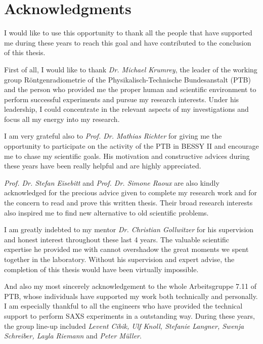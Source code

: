\pagestyle{empty}
\noindent
\section*{Acknowledgments}

I would like to use this opportunity to thank all the people that have supported me during these years to reach this goal and have contributed to the conclusion of this thesis.
\vspace{2ex}

\noindent First of all, I would like to thank \emph{Dr. Michael Krumrey}, the leader of the working group Röntgenradiometrie of the Physikalisch-Technische Bundesanstalt (PTB) and the person who provided me the proper human and scientific environment to perform successful experiments and pursue my research interests. Under his leadership, I could concentrate in the relevant aspects of my investigations and focus all my energy into my research.
\vspace{2ex}

\noindent I am very grateful also to \emph{Prof. Dr. Mathias Richter} for giving me the opportunity to participate on the activity of the PTB in BESSY II and encourage me to chase my scientific goals. His motivation and constructive advices during these years have been really helpful and are highly appreciated. 
\vspace{2ex}

\noindent \emph{Prof. Dr. Stefan Eisebitt} and \emph{Prof. Dr. Simone Raoux} are also kindly acknowledged for the precious advice given to complete my research work and for the concern to read and prove this written thesis. Their broad research interests also inspired me to find new alternative to old scientific problems.
\vspace{2ex}

\noindent I am greatly indebted to my mentor \emph{Dr. Christian Gollwitzer} for his supervision and honest interest throughout these last 4 years. The valuable scientific expertise he provided me with cannot overshadow the great moments we spent together in the laboratory. Without his supervision and expert advise, the completion of this thesis would have been virtually impossible.
\vspace{2ex}

\noindent And also my most sincerely acknowledgement to the whole Arbeitsgruppe 7.11 of PTB, whose individuals have supported my work both technically and personally. I am especially thankful to all the engineers who have provided the technical support to perform SAXS experiments in a outstanding way. During these years, the group line-up included \emph{Levent Cibik, Ulf Knoll, Stefanie Langner, Swenja Schreiber, Layla Riemann} and \emph{Peter Müller}.
\vspace{2ex}

